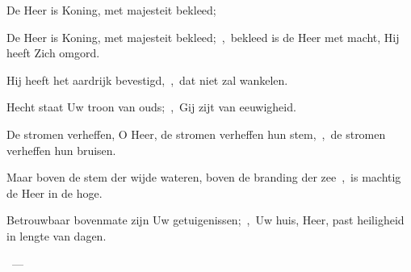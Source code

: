 \documentclass[12pt,twoside,a5paper]{article}
\begin{document}
\begin{halfparskip}
   De Heer is Koning, met majesteit bekleed;


  De Heer is Koning, met majesteit bekleed;~\sep\ bekleed is de Heer met macht, Hij heeft Zich omgord.

  Hij heeft het aardrijk bevestigd,~\sep\ dat niet zal wankelen.

  Hecht staat Uw troon van ouds;~\sep\ Gij zijt van eeuwigheid.

  De stromen verheffen, O Heer, de stromen verheffen hun stem,~\sep\ de stromen verheffen hun bruisen.

  Maar boven de stem der wijde wateren, boven de branding der zee~\sep\ is machtig de Heer in de hoge.

  Betrouwbaar bovenmate zijn Uw getuigenissen;~\sep\ Uw huis, Heer, past heiligheid in lengte van dagen.

  ~--- 
\end{halfparskip}
\end{document}
